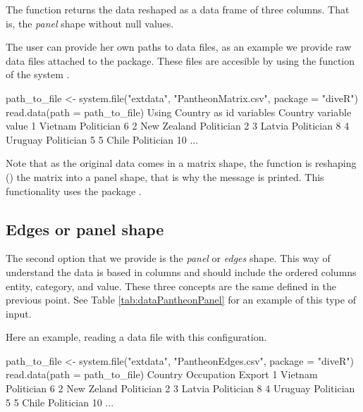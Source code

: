   
  
  The function returns the data reshaped as a data frame of three columns. That is, the \emph{panel} shape without null values.
  
  The user can provide her own paths to data files, as an example we provide raw data files attached to the package. These files are accesible by using the function of the system . 
  
  \begin{example}
 path_to_file <- system.file("extdata", "PantheonMatrix.csv", package = "diveR")
 read.data(path = path_to_file)
 Using Country as id variables
         Country            variable value
1        Vietnam          Politician     6
2    New Zealand          Politician     2
3         Latvia          Politician     8
4        Uruguay          Politician     5
5          Chile          Politician    10
...
\end{example}

Note that as the original data comes in a matrix shape, the function  is reshaping () the matrix into a panel shape, that is why the message  is printed. This functionality uses the package .


  \subsection{Edges or panel shape}
  The second option that we provide is the \emph{panel} or \emph{edges} shape. This way of understand the data is based in columns and should include the ordered columns entity, category, and value. These three concepts are the same defined in the previous point. See Table \ref{tab:dataPantheonPanel} for an example of this type of input.



Here an example, reading a data file with this configuration.

\begin{example}
 path_to_file <- system.file("extdata", "PantheonEdges.csv", package = "diveR")
 read.data(path = path_to_file)
         Country          Occupation Export
1        Vietnam          Politician      6
2     New Zeland          Politician      2
3         Latvia          Politician      8
4        Uruguay          Politician      5
5          Chile          Politician     10
...
\end{example}


